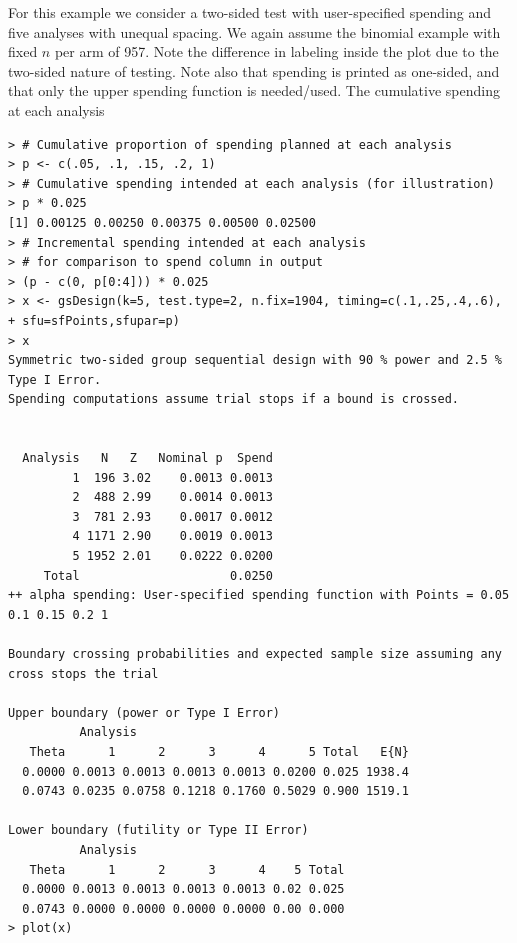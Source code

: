 For this example we consider a two-sided test with user-specified spending 
and five analyses with unequal spacing. We again assume the binomial example 
with fixed $n$ per arm of 957. Note the difference in labeling inside the 
plot due to the two-sided nature of testing. Note also that spending is 
printed as one-sided, and that only the upper spending function is needed/used. 
The cumulative spending at each analysis 

\bigskip

\begin{verbatim}
> # Cumulative proportion of spending planned at each analysis
> p <- c(.05, .1, .15, .2, 1)
> # Cumulative spending intended at each analysis (for illustration)
> p * 0.025
[1] 0.00125 0.00250 0.00375 0.00500 0.02500
> # Incremental spending intended at each analysis
> # for comparison to spend column in output
> (p - c(0, p[0:4])) * 0.025
> x <- gsDesign(k=5, test.type=2, n.fix=1904, timing=c(.1,.25,.4,.6),
+ sfu=sfPoints,sfupar=p)
> x
Symmetric two-sided group sequential design with 90 % power and 2.5 % Type I Error.
Spending computations assume trial stops if a bound is crossed.

               
  Analysis   N   Z   Nominal p  Spend
         1  196 3.02    0.0013 0.0013
         2  488 2.99    0.0014 0.0013
         3  781 2.93    0.0017 0.0012
         4 1171 2.90    0.0019 0.0013
         5 1952 2.01    0.0222 0.0200
     Total                     0.0250 
++ alpha spending: User-specified spending function with Points = 0.05 0.1 0.15 0.2 1

Boundary crossing probabilities and expected sample size assuming any cross stops the trial

Upper boundary (power or Type I Error)
          Analysis
   Theta      1      2      3      4      5 Total   E{N}
  0.0000 0.0013 0.0013 0.0013 0.0013 0.0200 0.025 1938.4
  0.0743 0.0235 0.0758 0.1218 0.1760 0.5029 0.900 1519.1

Lower boundary (futility or Type II Error)
          Analysis
   Theta      1      2      3      4    5 Total
  0.0000 0.0013 0.0013 0.0013 0.0013 0.02 0.025
  0.0743 0.0000 0.0000 0.0000 0.0000 0.00 0.000
> plot(x)
\end{verbatim}


